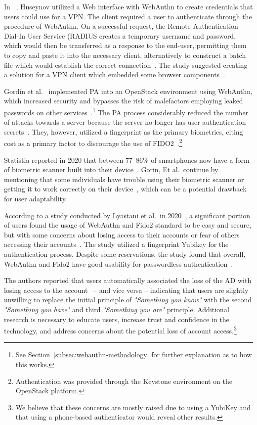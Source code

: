 In ~\cite{huseynov2022passwordless}, Huseynov utilized a Web interface with
WebAuthn to create credentials that users could use for a VPN\@.
The client required a user to authenticate through the procedure of WebAuthn.
On a successful request, the Remote Authentication Dial-In User Service (RADIUS
creates a temporary username and password, which would then be transferred
as a response to the end-user, permitting them to copy and paste it into the
necessary client, alternatively to construct a batch file which would establish
the correct connection~\cite{huseynov2022passwordless}.
The study suggested creating a solution for a VPN client which embedded some
browser components~\cite{huseynov2022passwordless}.

Gordin et al.~\cite{gordin2021moving} implemented PA into an OpenStack
environment using WebAuthn, which increased security and bypasses the risk of
malefactors employing leaked passwords on other
services~\cite{gordin2021moving}.\footnote{
  See Section~\ref{subsec:webauthn-methodology} for further explanation as to how this
  works.
}
The PA process considerably reduced the number of attacks towards a server
because the server no longer has user authentication
secrets~\cite{gordin2021moving}.
They, however, utilized a fingerprint as the primary biometrics, citing cost as
a primary factor to discourage the use of
FIDO2~\cite{gordin2021moving}.\footnote{
  Authentication was provided through the Keystone environment on the OpenStack
  platform.
}

Statistia reported in 2020 that between 77--86\% of smartphones now have a form
of biometric scanner built into their
device~\cite{statista-biometric-transactions}.
Gorin, Et al.\ continue by mentioning that some individuals have trouble
using their biometric scanner or getting it to work correctly on their
device~\cite{gordin2021moving}, which can be a potential drawback for user
adaptability.

According to a study conducted by Lyastani et al.\ in
2020~\cite{ghrobany2020fido2}, a significant portion of users found the usage
of WebAuthn and Fido2 standard to be easy and secure, but with some concerns
about losing access to their accounts or fear of others accessing their
accounts~\cite{ghrobany2020fido2}.
The study utilized a fingerprint Yubikey for the authentication process.
Despite some reservations, the study found that overall, WebAuthn and Fido2
have good usability for passwordless authentication~\cite{ghrobany2020fido2}.

The authors reported that users automatically associated the loss of the AD with
losing access to the account~\cite{ghrobany2020fido2} -- and vice versa --
indicating that users are slightly unwilling to replace the initial principle of
\textit{"Something you know"} with the second \textit{"Something you have"} and
third \textit{"Something you are"} principle.
Additional research is necessary to educate users, increase trust and confidence
in the technology, and address concerns about the potential loss of account
access.\footnote{
  We believe that these concerns are mostly raised due to using a YubiKey
  and that using a phone-based authenticator would reveal other results.
}

